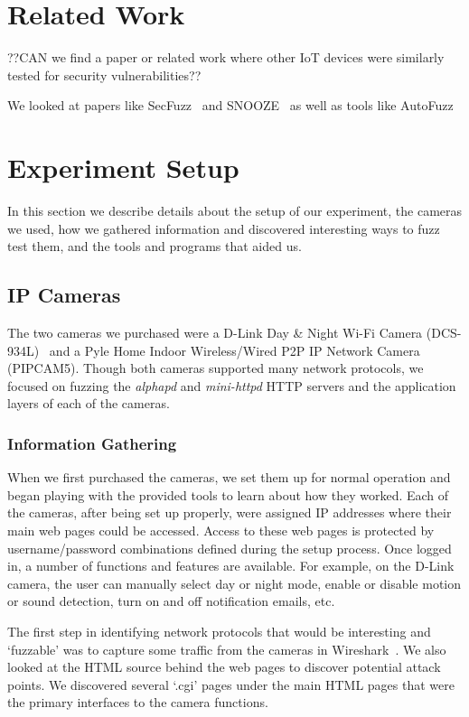 \documentclass[letterpaper,twocolumn,10pt]{article}
\begin{document}
\section{Related Work}
??CAN we find a paper or related work where other IoT devices were similarly tested for security vulnerabilities??


We looked at papers like SecFuzz~\cite{secfuzz} and SNOOZE~\cite{snooze} as well as tools like AutoFuzz~\cite{autofuzz}

\section{Experiment Setup}
In this section we describe details about the setup of our experiment, the
cameras we used, how we gathered information and discovered interesting ways to fuzz test them, and the tools and programs that aided us.  

\subsection{IP Cameras}
The two cameras we purchased were a D-Link Day \& Night Wi-Fi Camera (DCS-934L)~\cite{dlinkCam} and a Pyle Home Indoor Wireless/Wired P2P IP Network Camera (PIPCAM5). Though both cameras supported many network protocols, we focused on fuzzing the \textit{alphapd} and \textit{mini-httpd} HTTP servers and the application layers of each of the cameras. 


\subsubsection{Information Gathering}
When we first purchased the cameras, we set them up for normal operation and began playing with the provided tools to learn about how they worked. Each of the cameras, after being set up properly, were assigned IP addresses where their main web pages could be accessed. Access to these web pages is protected by username/password combinations defined during the setup process. Once logged in, a number of functions and features are available. For example, on the D-Link camera, the user can manually select day or night mode, enable or disable motion or sound detection, turn on and off notification emails, etc. 

The first step in identifying network protocols that would be interesting and `fuzzable' was to capture some traffic from the cameras in Wireshark~\cite{wireshark}. We also looked at the HTML source behind the web pages to discover potential attack points. We discovered several `.cgi' pages under the main HTML pages that were the primary interfaces to the camera functions. 
\end{document}
